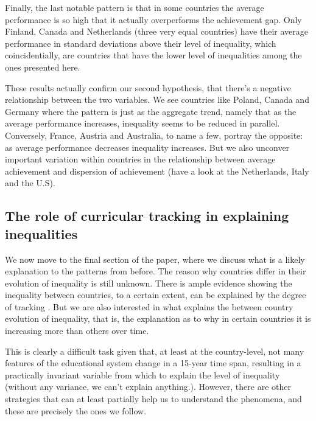 \documentclass[11pt, a4paper]{article}\usepackage[]{graphicx}\usepackage[]{color}
\begin{document}
Finally, the last notable pattern is that in some countries the average performance is so high that it actually overperforms the achievement gap. Only Finland, Canada and Netherlands (three very equal countries) have their average performance in standard deviations above their level of inequality, which coincidentially, are countries that have the lower level of inequalities among the ones presented here.

These results actually confirm our second hypothesis, that there's a negative relationship between the two variables. We see countries like Poland, Canada and Germany where the pattern is just as the aggregate trend, namely that as the average performance increases, inequality seems to be reduced in parallel. Conversely, France, Austria and Australia, to name a few, portray the opposite: as average performance decreases inequality increases. But we also unconver important variation within countries in the relationship between average achievement and dispersion of achievement (have a look at the Netherlands, Italy and the U.S).

\subsection{The role of curricular tracking in explaining inequalities}











We now move to the final section of the paper, where we discuss what is a likely explanation to the patterns from before. The reason why countries differ in their evolution of inequality is still unknown. There is ample evidence showing the inequality between countries, to a certain extent, can be explained by the degree of tracking \citep{hanushek_woesmann_tracking}. But we are also interested in what explains the between country evolution of inequality, that is, the explanation as to why in certain countries it is increasing more than others over time.

This is clearly a difficult task given that, at least at the country-level, not many features of the educational system change in a 15-year time span, resulting in a practically invariant variable from which to explain the level of inequality (without any variance, we can't explain anything.). However, there are other strategies that can at least partially help us to understand the phenomena, and these are precisely the ones we follow.
\end{document}
